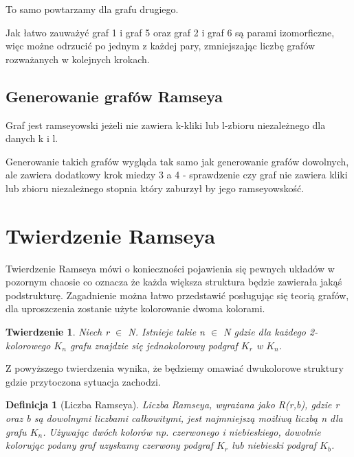 \documentclass[11pt]{article}
\newtheorem{theorem}{Twierdzenie}
\newtheorem{definition}{Definicja}[section]
\begin{document}
To samo powtarzamy dla grafu drugiego. 

Jak łatwo zauważyć graf 1 i graf 5 oraz graf 2 i graf 6 są parami izomorficzne, więc możne odrzucić po jednym z każdej pary, zmniejszając liczbę grafów rozważanych w kolejnych krokach.  


   \subsection{Generowanie grafów Ramseya}
   Graf jest ramseyowski jeżeli nie zawiera k-kliki lub l-zbioru niezależnego dla danych k i l. 

   Generowanie takich grafów wygląda tak samo jak generowanie grafów dowolnych, ale zawiera dodatkowy krok miedzy 3 a 4 - sprawdzenie czy graf nie zawiera kliki lub zbioru niezależnego stopnia który zaburzył by jego ramseyowskość.  

\section{Twierdzenie Ramseya}

Twierdzenie Ramseya mówi o konieczności pojawienia się pewnych układów w pozornym chaosie co oznacza że każda większa struktura będzie zawierała jakąś podstrukturę. Zagadnienie można łatwo przedstawić posługując się teorią grafów, dla uproszczenia zostanie użyte kolorowanie dwoma kolorami.

\begin{theorem}
Niech r $\in$ N. Istnieje takie n $\in$ N gdzie dla każdego 2-kolorowego $\mathit{K}_{n}$ grafu znajdzie się jednokolorowy podgraf $\mathit{K}_{r}$ w $\mathit{K}_{n}$.
\end{theorem}

Z powyższego twierdzenia wynika, że będziemy omawiać dwukolorowe struktury gdzie przytoczona sytuacja zachodzi. 

\begin{definition}[Liczba Ramseya]
Liczba Ramseya, wyrażana jako R(r,b), gdzie r oraz b są dowolnymi liczbami całkowitymi, jest najmniejszą możliwą liczbą n dla grafu $\mathit{K}_{n}$. Używając dwóch kolorów np. czerwonego i niebieskiego, dowolnie kolorując podany graf uzyskamy czerwony podgraf $\mathit{K}_{r}$ lub niebieski podgraf $\mathit{K}_{b}$.
\end{definition}
\end{document}
